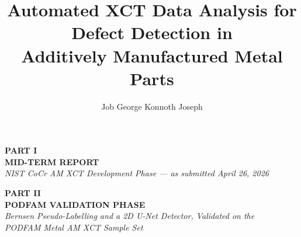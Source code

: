 \documentclass[12pt,a4paper,oneside]{report}
\title{Automated XCT Data Analysis for Defect Detection in\\ Additively Manufactured Metal Parts}
\author{Job George Konnoth Joseph}
\date{}
\newcommand{\mychapter}[1]{\chapter*{#1}\addcontentsline{toc}{chapter}{#1}\markboth{#1}{}}
\begin{document}


\tableofcontents
\clearpage

\clearpage

\setcounter{page}{1}

\begin{center}
{\large\bfseries PART I}\\[4pt]
{\Huge\bfseries MID-TERM REPORT}\\[8pt]
{\large\itshape NIST CoCr AM XCT Development Phase --- as submitted April 26, 2026}
\end{center}
\clearpage














\clearpage
\begin{center}
{\large\bfseries PART II}\\[4pt]
{\Huge\bfseries PODFAM VALIDATION PHASE}\\[8pt]
{\large\itshape Bernsen Pseudo-Labelling and a 2D U-Net Detector, Validated on the\\
PODFAM Metal AM XCT Sample Set}
\end{center}
\clearpage
\end{document}
